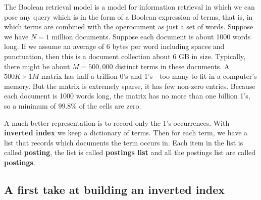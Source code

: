 \documentclass[letterpaper,11pt]{article}
\begin{document}
The Boolean retrieval model is a model for information retrieval in which we can pose any query which is in the form of a Boolean expression of terms, that is, in which terms are combined with the operocument as just a set of words.
Suppose we have $N = 1$ million documents. Suppose each document is about 1000 words long. If we assume an average of 6 bytes per word including spaces and punctuation, then this is a document collection about  6 GB in size. Typically, there might be about $M = 500,000$ distinct terms in these documents. A $500K \times 1M$ matrix has half-a-trillion 0's and 1's - too many to fit in a computer's memory. But the matrix is extremely sparse, it has few non-zero entries. Because each document is 1000 words long, the matrix has no more than one billion 1's, so a minimum of $99.8\%$ of the cells are zero.

A much better representation is to record only the 1's occurrences. With \textbf{inverted index} we keep a dictionary of terms. Then for each term, we have a list that records which documents the term occurs in. Each item in the list is called \textbf{posting}, the list is called \textbf{postings list} and all the postings list are called \textbf{postings}.

\subsection{A first take at building an inverted index}
\end{document}
